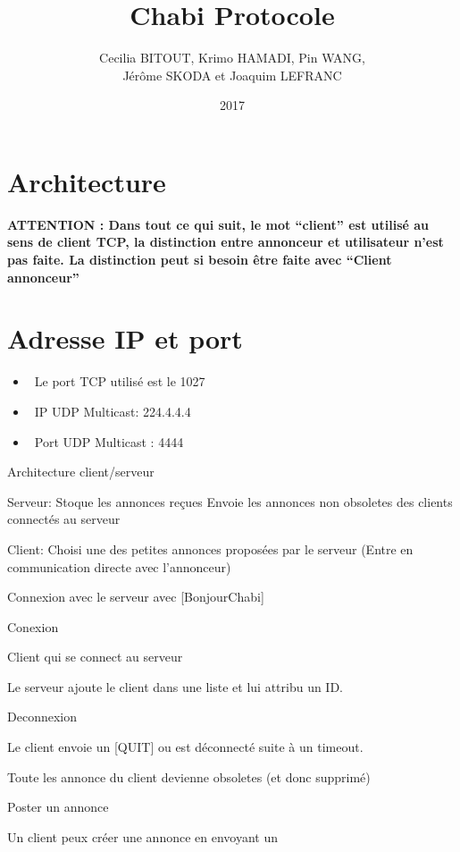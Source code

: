 \documentclass[12pt]{article}
\title{Chabi Protocole}
\author{
  Cecilia BITOUT, Krimo HAMADI, Pin WANG, \\
  Jérôme SKODA et Joaquim LEFRANC
}
\date{2017}
\begin{document}
\maketitle
\section{Architecture}

\textbf{ATTENTION : Dans tout ce qui suit, le mot ``client'' est utilisé au sens de
client TCP, la distinction entre annonceur et utilisateur n'est pas faite.
La distinction peut si besoin être faite avec ``Client annonceur''}
\newline


\section{Adresse IP et port}

\begin{itemize}
  \item~Le port TCP utilisé est le 1027
  \item~IP UDP Multicast: 224.4.4.4
  \item~Port UDP Multicast : 4444
\end{itemize}






Architecture client/serveur

Serveur:
Stoque les annonces reçues
Envoie les annonces non obsoletes des clients connectés au serveur






Client:
Choisi une des petites annonces proposées par le serveur
(Entre en communication directe avec l'annonceur)

Connexion avec le serveur avec [BonjourChabi]


Conexion

Client qui se connect au serveur

Le serveur ajoute le client dans une liste et lui attribu un ID.

Deconnexion

Le client envoie un [QUIT] ou est déconnecté suite à un timeout.

Toute les annonce du client devienne obsoletes (et donc supprimé)


Poster un annonce

Un client peux créer une annonce en envoyant un
\end{document}
